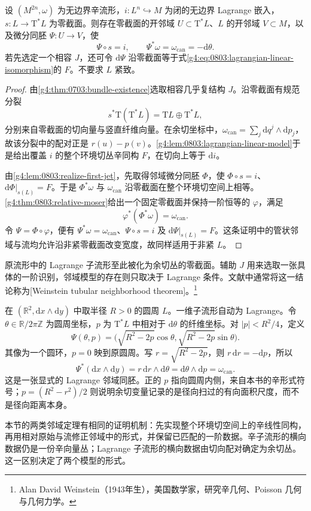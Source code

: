 \begin{theorem}\label{g4:thm:0803:lagrangian-neighborhood}
	设 \((M^{2n},\omega)\) 为无边界辛流形，\(i:L^n\hookrightarrow M\) 为闭的无边界 Lagrange 嵌入，\(s:L\to\mathrm{T}^*L\) 为零截面。则存在零截面的开邻域 \(U\subset\mathrm{T}^*L\)、\(L\) 的开邻域 \(V\subset M\)，以及微分同胚 \(\Psi:U\to V\)，使
	\[
		\Psi\circ s=i,\qquad \Psi^*\omega=\omega_{\mathrm{can}}=-\mathrm{d}\theta.
	\]
	若先选定一个相容 \(J\)，还可令 \(\mathrm{d}\Psi\) 沿零截面等于式\eqref{g4:eq:0803:lagrangian-linear-isomorphism}的 \(F\)。不要求 \(L\) 紧致。
\end{theorem}
\begin{proof}
	由\cref{g4:thm:0703:bundle-existence}选取相容几乎复结构 \(J\)。沿零截面有规范分裂
	\[
		s^*\mathrm{T}(\mathrm{T}^*L)=\mathrm{T}L\oplus\mathrm{T}^*L,
	\]
	分别来自零截面的切向量与竖直纤维向量。在余切坐标中，\(\omega_{\mathrm{can}}=\sum_j\mathrm{d}q^j\wedge\mathrm{d}p_j\)，故该分裂中的配对正是 \(r(u)-p(v)\)。\cref{g4:lem:0803:lagrangian-linear-model}于是给出覆盖 \(i\) 的整个环境切丛辛同构 \(F\)，在切向上等于 \(\mathrm{d}i\)。

	由\cref{g4:lem:0803:realize-first-jet}，先取得邻域微分同胚 \(\Phi\)，使 \(\Phi\circ s=i\)、\(\mathrm{d}\Phi|_{s(L)}=F\)。于是 \(\Phi^*\omega\) 与 \(\omega_{\mathrm{can}}\) 沿零截面在整个环境切空间上相等。\cref{g4:thm:0803:relative-moser}给出一个固定零截面并保持一阶恒等的 \(\varphi\)，满足
	\[
		\varphi^*(\Phi^*\omega)=\omega_{\mathrm{can}}.
	\]
	令 \(\Psi=\Phi\circ\varphi\)，便有 \(\Psi^*\omega=\omega_{\mathrm{can}}\)、\(\Psi\circ s=i\) 及 \(\mathrm{d}\Psi|_{s(L)}=F\)。这条证明中的管状邻域与流均允许沿非紧零截面改变宽度，故同样适用于非紧 \(L\)。
\end{proof}

原流形中的 Lagrange 子流形至此被化为余切丛的零截面。辅助 \(J\) 用来选取一张具体的一阶识别，邻域模型的存在则只取决于 Lagrange 条件。文献中通常将这一结论称为[Weinstein tubular neighborhood theorem]。\footnote{Alan David Weinstein（1943年生），美国数学家，研究辛几何、Poisson 几何与几何力学。}\cite[第2.2--2.3节，定理2.8、2.10，第95--97页]{Cannas2006Symplectic}

\begin{example}\label{g4:exm:0803:circle-neighborhood}
	在 \((\mathbb R^2,\mathrm{d}x\wedge\mathrm{d}y)\) 中取半径 \(R>0\) 的圆周 \(L\)。一维子流形自动为 Lagrange。令 \(\theta\in\mathbb R/2\pi\mathbb Z\) 为圆周坐标，\(p\) 为 \(\mathrm{T}^*L\) 中相对于 \(\mathrm{d}\theta\) 的纤维坐标。对 \(|p|<R^2/4\)，定义
	\[
		\Psi(\theta,p)=\bigl(\sqrt{R^2-2p}\cos\theta,\sqrt{R^2-2p}\sin\theta\bigr).
	\]
	其像为一个圆环，\(p=0\) 映到原圆周。写 \(r=\sqrt{R^2-2p}\)，则 \(r\,\mathrm{d}r=-\mathrm{d}p\)，所以
	\[
		\Psi^*(\mathrm{d}x\wedge\mathrm{d}y)
		=r\,\mathrm{d}r\wedge\mathrm{d}\theta
		=\mathrm{d}\theta\wedge\mathrm{d}p
		=\omega_{\mathrm{can}}.
	\]
	这是一张显式的 Lagrange 邻域同胚。正的 \(p\) 指向圆周内侧，来自本书的辛形式符号；\(p=(R^2-r^2)/2\) 则说明余切变量记录的是径向扫过的有向面积尺度，而不是径向距离本身。
\end{example}

本节的两类邻域定理有相同的证明机制：先实现整个环境切空间上的辛线性同构，再用相对原始与流修正邻域中的形式，并保留已匹配的一阶数据。辛子流形的横向数据仍是一份辛向量丛；Lagrange 子流形的横向数据由切向配对确定为余切丛。这一区别决定了两个模型的形式。
